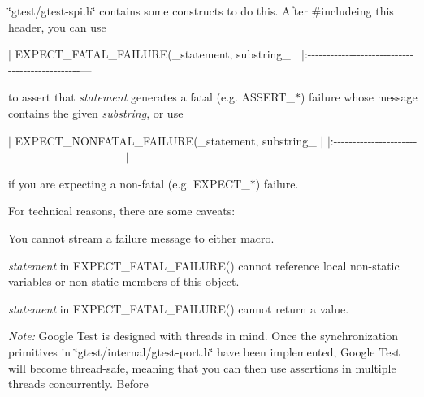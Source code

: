 {\ttfamily \char`\"{}gtest/gtest-\/spi.\+h\char`\"{}} contains some constructs to do this. After {\ttfamily \#include}ing this header, you can use

$\vert$ {\ttfamily E\+X\+P\+E\+C\+T\+\_\+\+F\+A\+T\+A\+L\+\_\+\+F\+A\+I\+L\+U\+RE(}\+\_\+statement, substring\+\_\+{\ttfamily );} $\vert$ $\vert$\+:-\/-\/-\/-\/-\/-\/-\/-\/-\/-\/-\/-\/-\/-\/-\/-\/-\/-\/-\/-\/-\/-\/-\/-\/-\/-\/-\/-\/-\/-\/-\/-\/-\/-\/-\/-\/-\/-\/-\/-\/-\/-\/-\/-\/-\/-\/-\/---$\vert$

to assert that {\itshape statement} generates a fatal (e.\+g. {\ttfamily A\+S\+S\+E\+R\+T\+\_\+$\ast$}) failure whose message contains the given {\itshape substring}, or use

$\vert$ {\ttfamily E\+X\+P\+E\+C\+T\+\_\+\+N\+O\+N\+F\+A\+T\+A\+L\+\_\+\+F\+A\+I\+L\+U\+RE(}\+\_\+statement, substring\+\_\+{\ttfamily );} $\vert$ $\vert$\+:-\/-\/-\/-\/-\/-\/-\/-\/-\/-\/-\/-\/-\/-\/-\/-\/-\/-\/-\/-\/-\/-\/-\/-\/-\/-\/-\/-\/-\/-\/-\/-\/-\/-\/-\/-\/-\/-\/-\/-\/-\/-\/-\/-\/-\/-\/-\/-\/-\/-\/---$\vert$

if you are expecting a non-\/fatal (e.\+g. {\ttfamily E\+X\+P\+E\+C\+T\+\_\+$\ast$}) failure.

For technical reasons, there are some caveats\+:


\begin{DoxyEnumerate}
\item You cannot stream a failure message to either macro.
\end{DoxyEnumerate}
\begin{DoxyEnumerate}
\item {\itshape statement} in {\ttfamily E\+X\+P\+E\+C\+T\+\_\+\+F\+A\+T\+A\+L\+\_\+\+F\+A\+I\+L\+U\+R\+E()} cannot reference local non-\/static variables or non-\/static members of {\ttfamily this} object.
\end{DoxyEnumerate}
\begin{DoxyEnumerate}
\item {\itshape statement} in {\ttfamily E\+X\+P\+E\+C\+T\+\_\+\+F\+A\+T\+A\+L\+\_\+\+F\+A\+I\+L\+U\+R\+E()} cannot return a value.
\end{DoxyEnumerate}

{\itshape Note\+:} Google Test is designed with threads in mind. Once the synchronization primitives in {\ttfamily \char`\"{}gtest/internal/gtest-\/port.\+h\char`\"{}} have been implemented, Google Test will become thread-\/safe, meaning that you can then use assertions in multiple threads concurrently. Before

